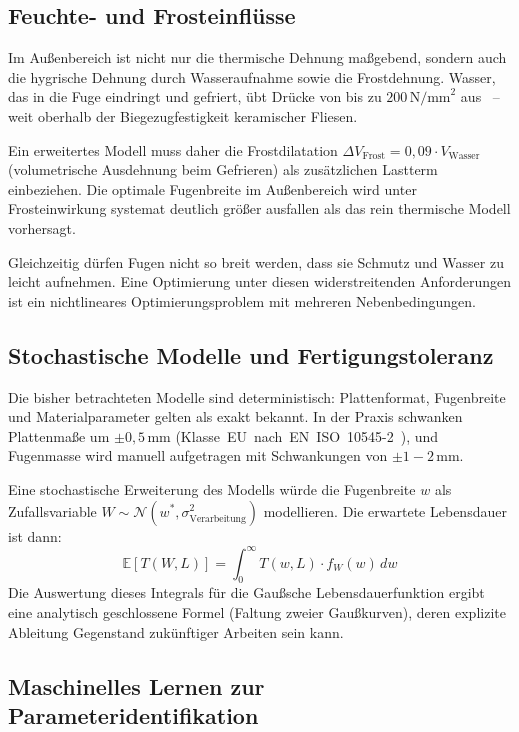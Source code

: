 ﻿\documentclass[a4paper,12pt]{article}
\theoremstyle{definition}
\begin{document}
\subsection{Feuchte- und Frosteinflüsse}

Im Außenbereich ist nicht nur die thermische Dehnung maßgebend,
sondern auch die hygrische Dehnung durch Wasseraufnahme sowie
die Frostdehnung. Wasser, das in die Fuge eindringt und gefriert,
übt Drücke von bis zu $200\,\text{N/mm}^2$ aus~\cite{powers1945} --
weit oberhalb der Biegezugfestigkeit keramischer Fliesen.

Ein erweitertes Modell muss daher die Frostdilatation
$\Delta V_{\text{Frost}} = 0{,}09 \cdot V_{\text{Wasser}}$
(volumetrische Ausdehnung beim Gefrieren) als zusätzlichen
Lastterm einbeziehen. Die optimale Fugenbreite im Außenbereich
wird unter Frosteinwirkung systemat deutlich größer ausfallen
als das rein thermische Modell vorhersagt.

Gleichzeitig dürfen Fugen nicht so breit werden, dass sie
Schmutz und Wasser zu leicht aufnehmen. Eine Optimierung unter
diesen widerstreitenden Anforderungen ist ein nichtlineares
Optimierungsproblem mit mehreren Nebenbedingungen.

\subsection{Stochastische Modelle und Fertigungstoleranz}

Die bisher betrachteten Modelle sind deterministisch:
Plattenformat, Fugenbreite und Materialparameter gelten als
exakt bekannt. In der Praxis schwanken Plattenmaße um
$\pm 0{,}5\,\text{mm}$ (Klasse~EU~nach~EN~ISO~10545-2~\cite{en10545}),
und Fugenmasse wird manuell aufgetragen mit Schwankungen von
$\pm 1{-}2\,\text{mm}$.

Eine stochastische Erweiterung des Modells würde die Fugenbreite $w$
als Zufallsvariable $W \sim \mathcal{N}(w^*, \sigma_{\text{Verarbeitung}}^2)$
modellieren. Die erwartete Lebensdauer ist dann:
\[
\mathbb{E}[T(W, L)] = \int_0^\infty T(w, L) \cdot f_W(w) \, dw
\]
Die Auswertung dieses Integrals für die Gaußsche Lebensdauerfunktion
ergibt eine analytisch geschlossene Formel (Faltung zweier Gaußkurven),
deren explizite Ableitung Gegenstand zukünftiger Arbeiten sein kann.

\subsection{Maschinelles Lernen zur Parameteridentifikation}
\end{document}
